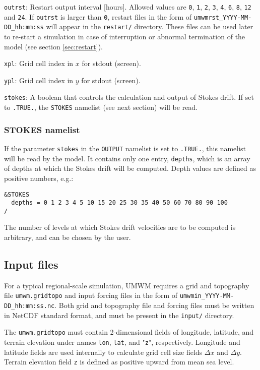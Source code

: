 \documentclass[letterpaper]{article}
\numberwithin{equation}{section}
\begin{document}
\verb+outrst+:
Restart output interval [hours].
Allowed values are \verb+0+, \verb+1+, \verb+2+, \verb+3+, \verb+4+, \verb+6+, \verb+8+, \verb+12+ and \verb+24+.
If \verb+outrst+ is larger than \verb+0+, restart files in the form of
\verb+umwmrst_YYYY-MM-DD_hh:mm:ss+ will appear in the \verb+restart/+ directory.
These files can be used later to re-start a simulation in case of interruption
or abnormal termination of the model (see section \ref{sec:restart}).

\verb+xpl+:
Grid cell index in $x$ for stdout (screen).

\verb+ypl+:
Grid cell index in $y$ for stdout (screen).

\verb+stokes+:
A boolean that controls the calculation and output of Stokes drift.
If set to \verb+.TRUE.+, the \verb+STOKES+ namelist (see next section)
will be read.

\subsubsection{STOKES namelist}
\label{sec:stokes_namelist}

If the parameter \verb+stokes+ in the \verb+OUTPUT+ namelist is set to \verb+.TRUE.+,
this namelist will be read by the model.
It contains only one entry, \verb+depths+, 
which is an array of depths at which the Stokes drift will be computed.
Depth values are defined as positive numbers, e.g.:

\begin{verbatim}
&STOKES
  depths = 0 1 2 3 4 5 10 15 20 25 30 35 40 50 60 70 80 90 100
/
\end{verbatim}

The number of levels at which Stokes drift velocities are to be computed 
is arbitrary, and can be chosen by the user.

\subsection{Input files}

For a typical regional-scale simulation, 
UMWM requires a grid and topography file \verb+umwm.gridtopo+
and input forcing files in the form of \verb+umwmin_YYYY-MM-DD_hh:mm:ss.nc+.
Both grid and topography file and forcing files must be written in NetCDF
standard format, and must be present in the \verb+input/+ directory.

The \verb+umwm.gridtopo+ must contain 2-dimensional fields
of longitude, latitude, and terrain elevation under names 
\verb+lon+, \verb+lat+, and "\verb+z+", respectively.
Longitude and latitude fields are used internally to calculate
grid cell size fields $\Delta x$ and $\Delta y$.
Terrain elevation field \verb+z+ is defined as positive upward from
mean sea level.
\end{document}
